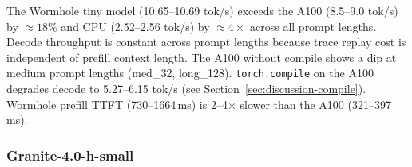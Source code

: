 \begin{table}[h]
\caption{Prefill TTFT (ms), tiny model. Lower is better. $^*$See Table~\ref{tab:tiny-decode} footnote.}
\label{tab:tiny-prefill}
\end{table}

The Wormhole tiny model (10.65--10.69 tok/s) exceeds the A100 (8.5--9.0 tok/s) by ${\approx}18\%$ and CPU (2.52--2.56 tok/s) by ${\approx}4\times$ across all prompt lengths. Decode throughput is constant across prompt lengths because trace replay cost is independent of prefill context length. The A100 without compile shows a dip at medium prompt lengths (med\_32, long\_128). \texttt{torch.compile} on the A100 degrades decode to 5.27--6.15 tok/s (see Section~\ref{sec:discussion-compile}). Wormhole prefill TTFT (730--1664\,ms) is 2--4$\times$ slower than the A100 (321--397\,ms).

\subsubsection{Granite-4.0-h-small}

\begin{table}[h]
\caption{Decode throughput (tok/s), small model. Higher is better. $^*$See Table~\ref{tab:tiny-decode} footnote.}
\label{tab:small-decode}
\end{table}

